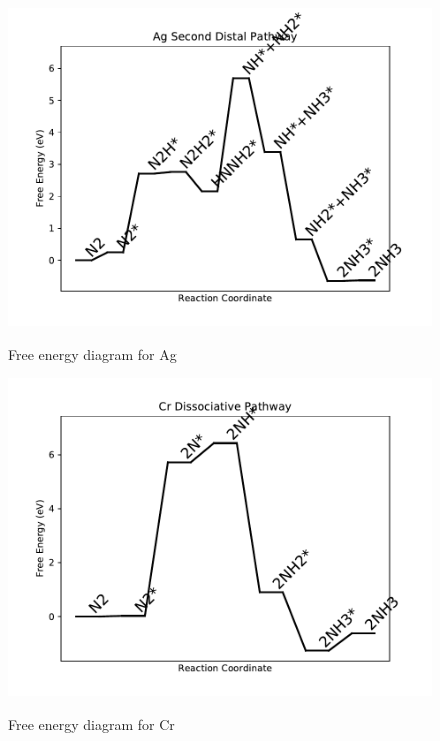 \documentclass{article}
\begin{document}
\begin{figure}
\includegraphics[width=1\linewidth]{data/plots/Ag_distal_2.pdf}
\label{fig:Ag_distal_2}
\caption{Free energy diagram for Ag}
\end{figure}

\begin{figure}
\includegraphics[width=1\linewidth]{data/plots/Cr_dissociative.pdf}
\label{fig:Cr_dissociative}
\caption{Free energy diagram for Cr}
\end{figure}
\end{document}
